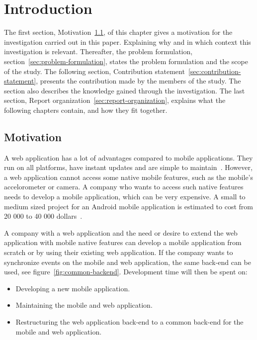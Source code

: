 \chapter{Introduction}\label{ch:introduction}
The first section, Motivation~\ref{sec:motivation}, of this chapter gives a motivation for the investigation carried out in this paper. Explaining why and in which context this investigation is relevant. Thereafter, the problem formulation, section~\ref{sec:problem-formulation}, states the problem formulation and the scope of the study. The following section, Contribution statement~\ref{sec:contribution-statement}, presents the contribution made by the members of the study. The section also describes the knowledge gained through the investigation. The last section, Report organization~\ref{sec:report-organization}, explains what the following chapters contain, and how they fit together.

	\section{Motivation}\label{sec:motivation}
A web application has a lot of advantages compared to mobile applications. They run on all platforms, have instant updates and are simple to maintain~\cite{michaels2013}. However, a web application cannot access some native mobile features, such as the mobile's accelorometer or camera. A company who wants to access such native features needs to develop a mobile application, which can be very expensive. A small to medium sized project for an Android mobile application is estimated to cost from 20 000 to 40 000 dollars~\cite{kohan2015}.

A company with a web application and the need or desire to extend the web application with mobile native features can develop a mobile application from scratch or by using their existing web application. If the company wants to synchronize events on the mobile and web application, the same back-end can be used, see figure~\ref{fig:common-backend}. Development time will then be spent on:
\begin{itemize}
\item Developing a new mobile application.
\item Maintaining the mobile and web application.
\item Restructuring the web application back-end to a common back-end for the mobile and web application.
\end{itemize}

